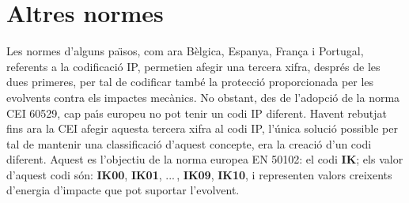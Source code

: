 \section{Altres normes}
Les normes d'alguns pa\"{\i}sos, com ara B\`{e}lgica, Espanya, Fran\c{c}a i
Portugal, referents a la codificaci\'{o} \textsf{IP}, permetien afegir
una tercera xifra, despr\'{e}s de les dues primeres,  per tal de
codificar tamb\'{e} la protecci\'{o} proporcionada per les evolvents contra
els impactes mec\`{a}nics. No obstant, des de l'adopci\'{o} de la norma
\textsf{CEI 60529}, cap pa\'{\i}s europeu no pot tenir
un codi \textsf{IP} diferent. Havent rebutjat fins ara la
\textsf{CEI} afegir aquesta tercera xifra al codi \textsf{IP},
l'\'{u}nica soluci\'{o} possible per tal de mantenir una classificaci\'{o}
d'aquest concepte, era la creaci\'{o} d'un codi diferent. Aquest es
l'objectiu de la norma europea \textsf{EN 50102}: el
codi \textbf{\textsf{IK}}; els valor d'aquest codi s\'{o}n:
\textbf{\textsf{IK00}}, \textbf{\textsf{IK01}}, ...\,,
\textbf{\textsf{IK09}}, \textbf{\textsf{IK10}}, i representen valors
creixents d'energia d'impacte que pot suportar l'evolvent.
